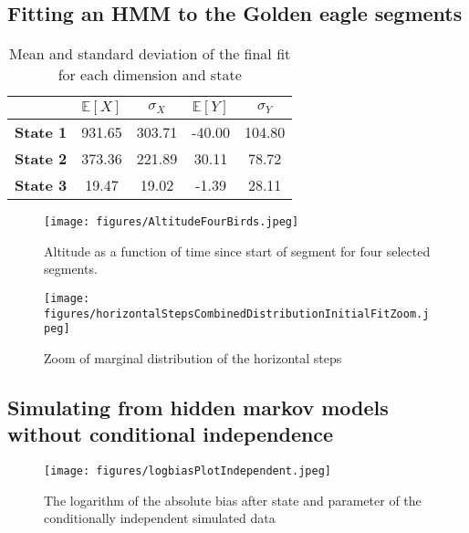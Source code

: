 \subsection{Fitting an HMM to the Golden eagle segments}\label{goldenEagleSegments}
\begin{table}[ht]
    \centering
    \begin{tabular}{lcccc}
      \hline
      & $\mathbb{E}\left[X\right]$ & $\sigma_X$ & $\mathbb{E}\left[Y\right]$ & $\sigma_Y$ \\ 
      \hline
      \textbf{State 1} & 931.65 & 303.71 & -40.00 & 104.80 \\ 
      \textbf{State 2} & 373.36 & 221.89 & 30.11 & 78.72 \\ 
      \textbf{State 3} & 19.47 & 19.02 & -1.39 & 28.11 \\ 
       \hline
    \end{tabular}
    \caption{Mean and standard deviation of the final fit for each dimension and state}
    \label{initialFitMeans}
\end{table}
\begin{figure}[h]
    \begin{center}
        \texttt{[image: figures/AltitudeFourBirds.jpeg]}
    \end{center}
    \caption{Altitude as a function of time since start of segment for four selected segments.}
    \label{fourSegments}
\end{figure}
\newpage
\begin{figure}[h]
    \begin{center}
        \texttt{[image: figures/horizontalStepsCombinedDistributionInitialFitZoom.jpeg]}
    \end{center}
    \caption{Zoom of marginal distribution of the horizontal steps}
    \label{zoomHorizontal}
\end{figure}
\subsection{Simulating from hidden markov models without conditional independence}
\begin{figure}[h]
  \centering
  \texttt{[image: figures/logbiasPlotIndependent.jpeg]}
  \caption{The logarithm of the absolute bias after state and parameter of the conditionally independent simulated data}
  \label{logbiasPlotIndependent}
\end{figure}\newpage
